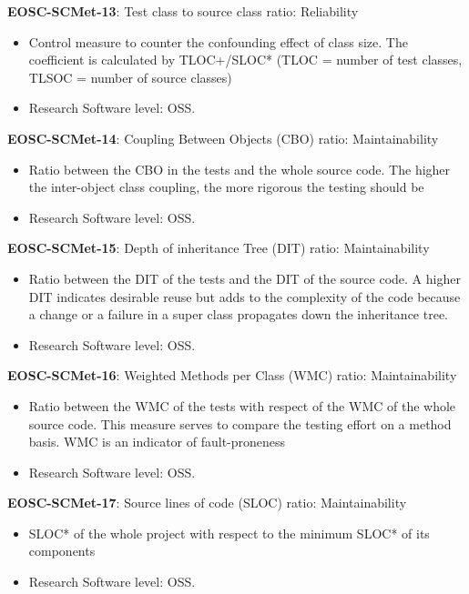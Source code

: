 \textbf{EOSC-SCMet-13}: Test class to source class ratio: Reliability

\begin{itemize}
    \item Control measure to counter the confounding effect of class size. The coefficient is calculated by TLOC+/SLOC*  (TLOC = number of test classes, TLSOC = number of source classes) \cite{nagappan_early_2005}
    \item Research Software level: OSS.
\end{itemize}

\textbf{EOSC-SCMet-14}: Coupling Between Objects (CBO) ratio: Maintainability

\begin{itemize}
    \item Ratio between the CBO in the tests and the whole source code. The higher the inter-object class coupling, the more rigorous the testing should be \cite{nagappan_early_2005}
    \item Research Software level: OSS.
\end{itemize}

\textbf{EOSC-SCMet-15}: Depth of inheritance Tree (DIT) ratio: Maintainability

\begin{itemize}
    \item Ratio between the DIT of the tests and the DIT of the source code. A higher DIT indicates desirable reuse but adds to the
complexity of the code because a change or a failure in a super class propagates down the inheritance tree. \cite{nagappan_early_2005}
    \item Research Software level: OSS.
\end{itemize}

\textbf{EOSC-SCMet-16}: Weighted Methods per Class (WMC) ratio: Maintainability

\begin{itemize}
    \item Ratio between the WMC of the tests with respect of the WMC of the whole source code. This measure serves to compare the testing effort on a method basis. WMC is an indicator of fault-proneness \cite{nagappan_early_2005}
    \item Research Software level: OSS.
\end{itemize}

\textbf{EOSC-SCMet-17}: Source lines of code (SLOC) ratio: Maintainability

\begin{itemize}
    \item SLOC* of the whole project with respect to the minimum SLOC* of its components \cite{nagappan_early_2005}
    \item Research Software level: OSS.
\end{itemize}

